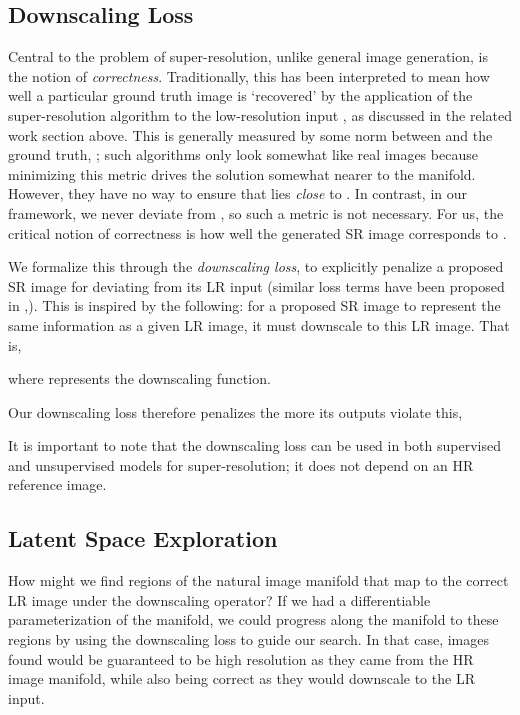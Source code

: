 \documentclass[10pt,twocolumn,letterpaper]{article}
\begin{document}
\subsection{Downscaling Loss}
Central to the problem of super-resolution, unlike general image generation, is the notion of \textit{correctness}. Traditionally, this has been interpreted to mean how well a particular ground truth image  is `recovered' by the application of the super-resolution algorithm  to the low-resolution input , as discussed in the related work section above. This is generally measured by some  norm between  and the ground truth, ; such algorithms only look somewhat like real images because minimizing this metric drives the solution somewhat nearer to the manifold. However, they have no way to ensure that  lies \textit{close} to . In contrast, in our framework, we never deviate from , so such a metric is not necessary. For us, the critical notion of correctness is how well the generated SR image  corresponds to .

We formalize this through the \textit{downscaling loss}, to explicitly penalize a proposed SR image for deviating from its LR input (similar loss terms have been proposed in \cite{styleganembedding},\cite{deep_prior}). This is inspired by the following: for a proposed SR image to represent the same information as a given LR image, it must downscale to this LR image. That is,

where  represents the downscaling function.

Our downscaling loss therefore penalizes  the more its outputs violate this,


It is important to note that the downscaling loss can be used in both supervised and unsupervised models for super-resolution; it does not depend on an HR reference image.

\subsection{Latent Space Exploration} \label{lse}
How might we find regions of the natural image manifold  that map to the correct LR image under the downscaling operator? If we had a differentiable parameterization of the manifold, we could progress along the manifold to these regions by using the downscaling loss to guide our search. In that case, images found would be guaranteed to be high resolution as they came from the HR image manifold, while also being correct as they would downscale to the LR input. 
\end{document}
